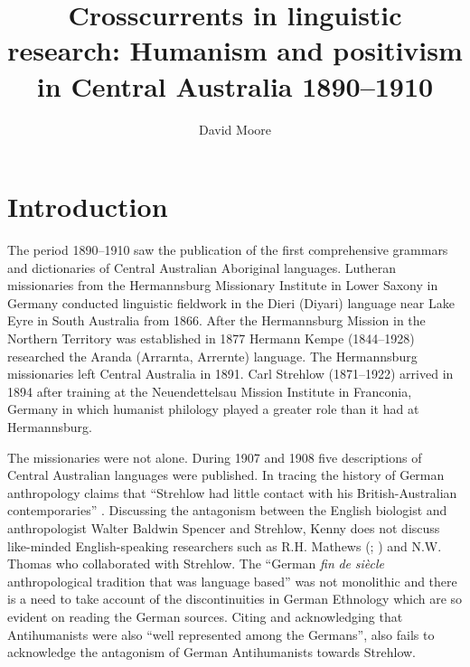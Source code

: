 \documentclass[output=paper]{langsci/langscibook}
\author{David Moore\affiliation{University of Western Australia}\orcid{}}
\title{Crosscurrents in linguistic research: Humanism and positivism in Central Australia 1890--1910}
\begin{document}
\maketitle

\section{Introduction} 

 The period 1890--1910 saw the publication of the first comprehensive grammars and dictionaries of Central  Australian Aboriginal languages. Lutheran missionaries from the Hermannsburg Missionary Institute in Lower Saxony in Germany conducted linguistic fieldwork in the Dieri (Diyari) language near Lake Eyre in South Australia from 1866. After the Hermannsburg Mission in the Northern Territory was established in 1877 Hermann Kempe (1844--1928) researched the Aranda (Arrarnta, Arrernte) language. The Hermannsburg missionaries left Central Australia in 1891. Carl Strehlow (1871--1922) arrived in 1894 after training at the Neuendettelsau Mission Institute in Franconia, Germany in which humanist philology played a greater role than it had at Hermannsburg.
 
 The missionaries were not alone. During 1907 and 1908 five descriptions of Central Australian languages were published. In tracing the history of German anthropology \citet[51]{Kenny2013} claims that “Strehlow had little contact with his British-Australian contemporaries” \citep[51]{kenny_arandas_2013}. Discussing the antagonism between the English biologist and anthropologist Walter Baldwin Spencer and Strehlow, Kenny does not discuss like-minded English-speaking researchers such as R.H. Mathews (\citealt{mathews_arranda_1907}; \citealt{thomas_culture_2007}) and N.W. Thomas who collaborated with Strehlow. The “German \textit{fin} \textit{de} \textit{siècle} anthropological tradition that was language based” \citep[99]{kenny_arandas_2013} was not monolithic and there is a need to take account of the discontinuities in German Ethnology which are so evident on reading the German sources. Citing \citet{monteath_globalising_2013} and acknowledging that Antihumanists were also “well represented among the Germans”, \citet[228]{kenny_arandas_2013} also fails to acknowledge the antagonism of German Antihumanists towards Strehlow.
 
\end{document}
